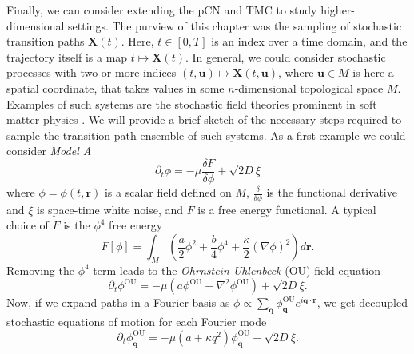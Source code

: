 Finally, we can consider extending the pCN and TMC to study higher-dimensional settings. The purview of this chapter was the sampling of stochastic transition paths $\mathbf{X}(t)$. Here, $t \in [0, T]$ is an index over a time domain, and the trajectory itself is a map $t \mapsto \mathbf{X}(t)$. In general, we could consider stochastic processes with two or more indices $(t, \mathbf{u}) \mapsto \mathbf{X}(t, \mathbf{u})$, where $\mathbf{u} \in M$ is here a spatial coordinate, that takes values in some $n$-dimensional topological space $M$. Examples of such systems are the stochastic field theories prominent in soft matter physics   \citep{catesTheoriesBinaryFluid2018, tiribocchiActiveModelScalar2015, stenhammarContinuumTheoryPhase2013, wittkowskiScalarF4Field2014, deanLangevinEquationDensity1996}. We will provide a brief sketch of the necessary steps required to sample the transition path ensemble of such systems. As a first example we could consider \textit{Model A} \citep{catesActiveFieldTheories2019}
\begin{equation}
	\partial_t \phi = - \mu \frac{\delta F}{\delta \phi} + \sqrt{2 D} \xi 
\end{equation}
where $\phi = \phi(t, \mathbf{r})$ is a scalar field defined on $M$, $\frac{\delta}{\delta \phi}$ is the functional derivative and $\xi$ is space-time white noise, and $F$ is a free energy functional. A typical choice of $F$ is the $\phi^4$ free energy
\begin{equation}
	F[\phi] = \int_M \left( \frac{a}{2} \phi^2 + \frac{b}{4} \phi^4 + \frac{\kappa}{2} (\nabla \phi)^2 \right) d \mathbf{r}.
\end{equation}
Removing the $\phi^4$ term leads to the \textit{Ohrnstein-Uhlenbeck} (OU) \citep{gardinerHandbookStochasticMethods1990} field equation
\begin{equation} \label{eq:OU process field}
	\partial_t \phi^\text{OU} = - \mu (a \phi^\text{OU} - \nabla^2 \phi^\text{OU}) + \sqrt{2D} \xi.
\end{equation}
Now, if we expand paths in a Fourier basis as $\phi \propto \sum_\mathbf{q} \phi^\text{OU}_\mathbf{q} e^{i \mathbf{q} \cdot \mathbf{r}}$, we get decoupled stochastic equations of motion for each Fourier mode
\begin{equation}
	\partial_t \phi^\text{OU}_\mathbf{q} = - \mu (a + \kappa q^2) \phi^\text{OU}_\mathbf{q} + \sqrt{2D} \xi.
\end{equation}
